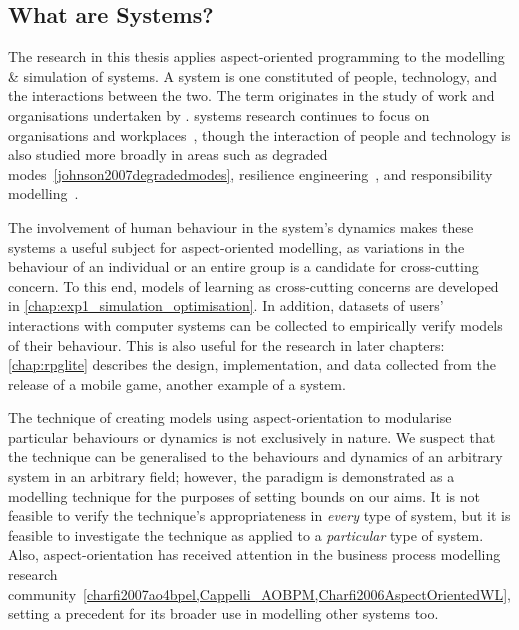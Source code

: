 \subsection{What are \SocioTechnical Systems?}

The research in this thesis applies aspect-oriented programming to the modelling
\& simulation of \sociotechnical systems. 
A \sociotechnical system is one constituted of people, technology, and the interactions
between the two. The term originates in the study of work and organisations
undertaken by \citet{trist1951sociotechnical}. \Sociotechnical systems research
continues to focus on organisations and
workplaces~\cite{pasmore2019reflections,baxter2011socio}, though the interaction
of people and technology is also studied more
broadly in areas such as degraded modes~\cref{johnson2007degradedmodes},
resilience engineering~\cite{hollnagel2006resilience}, and responsibility modelling~\cite{lock2009responsibility}.

The involvement of
human behaviour in the system's dynamics makes these systems a useful subject
for aspect-oriented modelling, as variations in the behaviour of an individual
or an entire group is a candidate for cross-cutting concern. To this end, models of learning as
cross-cutting concerns are developed in
\cref{chap:exp1_simulation_optimisation}. In addition,
datasets of users' interactions with computer systems can be collected to
empirically verify models of their behaviour. This is also useful for the
research in later chapters: \cref{chap:rpglite} describes the design,
implementation, and data collected from the release of a mobile game, another
example of a \sociotechnical system.

The technique of creating models using aspect-orientation to modularise
particular behaviours or dynamics is not exclusively \sociotechnical in nature.
We suspect that the technique can be generalised to the behaviours and dynamics
of an arbitrary system in an arbitrary field; however, the paradigm is
demonstrated as a \sociotechnical modelling technique for the purposes of
setting bounds on our aims. It is not feasible to verify the
technique's appropriateness in \emph{every} type of system, but it is feasible to
investigate the technique as applied to a \emph{particular} type of system.
Also, aspect-orientation has received attention in the business process
modelling research
community~\cref{charfi2007ao4bpel,Cappelli_AOBPM,Charfi2006AspectOrientedWL},
setting a precedent for its broader use in modelling other \sociotechnical
systems too.


